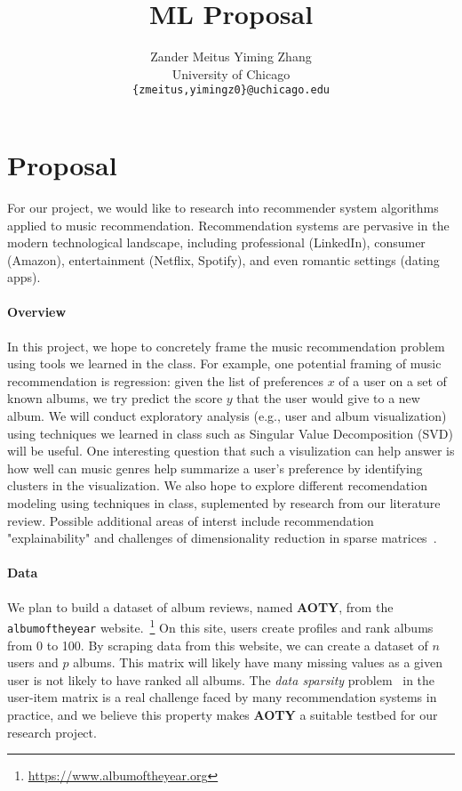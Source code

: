 \documentclass{article}
\title{ML Proposal}
\author{
  Zander Meitus \qquad Yiming Zhang \\
  University of Chicago \\
  \texttt{\{zmeitus,yimingz0\}@uchicago.edu}
}
\newcommand{\aoty}{{\bf AOTY}\xspace}
\begin{document}
\maketitle

\section{Proposal}

For our project, we would like to research into recommender system algorithms
 applied to music recommendation.
Recommendation systems are pervasive in the modern technological landscape,
 including professional (LinkedIn), consumer (Amazon), entertainment (Netflix,
 Spotify), and even romantic settings (dating apps).

\paragraph{Overview}
In this project, we hope to concretely frame the music recommendation problem
 using tools we learned in the class.
For example, one potential framing of music recommendation is regression: given
 the list of preferences $x$ of a user on a set of known albums, we try predict
 the score $y$ that the user would give to a new album.
We will conduct exploratory analysis (e.g., user and album visualization) using
 techniques we learned in class such as Singular Value Decomposition (SVD) will
 be useful.
One interesting question that such a visulization can help answer is how well
 can music genres help summarize a user's preference by identifying clusters in
 the visualization.
We also hope to explore different recomendation modeling using techniques in
 class, suplemented by research from our literature review.
Possible additional areas of interst include recommendation "explainability"
 and challenges of dimensionality reduction in sparse
 matrices~\citep{Afchar_2022,Ling_2021}.

\paragraph*{Data}
We plan to build a dataset of album reviews, named \aoty, from the {\tt
		 albumoftheyear} website.~\footnote{\url{https://www.albumoftheyear.org}} On
 this site, users create profiles and rank albums from 0 to 100.
By scraping data from this website, we can create a dataset of $n$ users and
 $p$ albums.
This matrix will likely have many missing values as a given user is not likely
 to have ranked all albums.
The {\em data sparsity} problem~\citep{suSurveyCollaborativeFiltering2009} in
 the user-item matrix is a real challenge faced by many recommendation systems
 in practice, and we believe this property makes \aoty a suitable testbed for
 our research project.
\end{document}
